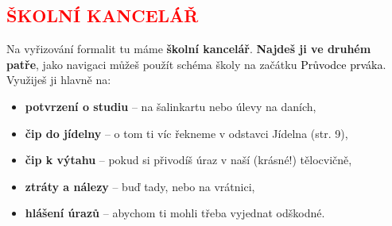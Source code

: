 \documentclass[a5paper, twoside]{article}
\newcommand{\podnadpis}[2]{
  \subsection*{\textcolor{#2}{#1}}
}
\begin{document}
\podnadpis{ŠKOLNÍ KANCELÁŘ}{red}

Na vyřizování formalit tu máme \textbf{školní kancelář}. \textbf{Najdeš ji ve druhém patře}, jako
navigaci můžeš použít schéma školy na začátku \textcolor{black}{\Kapitan Průvodce prváka}.
Využiješ ji hlavně na:
\begin{itemize}[leftmargin=10pt]
	\item \textbf{potvrzení o studiu} -- na šalinkartu nebo úlevy na daních,
	\item \textbf{čip do jídelny} -- o tom ti víc řekneme v odstavci Jídelna (str. 9),
	\item \textbf{čip k výtahu} -- pokud si přivodíš úraz v naší (krásné!) tělocvičně,
	\item \textbf{ztráty a nálezy} -- buď tady, nebo na vrátnici,
	\item \textbf{hlášení úrazů} -- abychom ti mohli třeba vyjednat odškodné.
\end{itemize}
\end{document}
